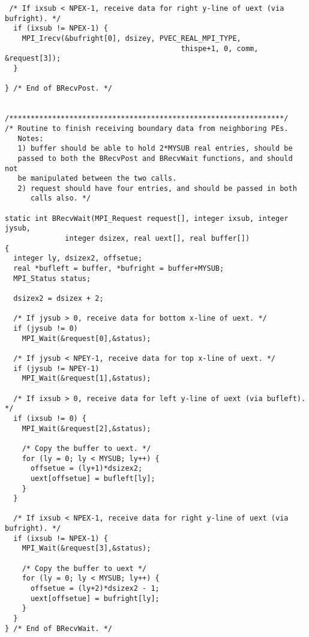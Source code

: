 \begin{verbatim}
 /* If ixsub < NPEX-1, receive data for right y-line of uext (via bufright). */
  if (ixsub != NPEX-1) {
    MPI_Irecv(&bufright[0], dsizey, PVEC_REAL_MPI_TYPE,
                                         thispe+1, 0, comm, &request[3]);
  }

} /* End of BRecvPost. */


/****************************************************************/
/* Routine to finish receiving boundary data from neighboring PEs.
   Notes:
   1) buffer should be able to hold 2*MYSUB real entries, should be
   passed to both the BRecvPost and BRecvWait functions, and should not
   be manipulated between the two calls.
   2) request should have four entries, and should be passed in both 
      calls also. */

static int BRecvWait(MPI_Request request[], integer ixsub, integer jysub,
		      integer dsizex, real uext[], real buffer[])
{
  integer ly, dsizex2, offsetue;
  real *bufleft = buffer, *bufright = buffer+MYSUB;
  MPI_Status status;

  dsizex2 = dsizex + 2;

  /* If jysub > 0, receive data for bottom x-line of uext. */
  if (jysub != 0)
    MPI_Wait(&request[0],&status);

  /* If jysub < NPEY-1, receive data for top x-line of uext. */
  if (jysub != NPEY-1)
    MPI_Wait(&request[1],&status);

  /* If ixsub > 0, receive data for left y-line of uext (via bufleft). */
  if (ixsub != 0) {
    MPI_Wait(&request[2],&status);

    /* Copy the buffer to uext. */
    for (ly = 0; ly < MYSUB; ly++) {
      offsetue = (ly+1)*dsizex2;
      uext[offsetue] = bufleft[ly];
    }
  }

  /* If ixsub < NPEX-1, receive data for right y-line of uext (via bufright). */
  if (ixsub != NPEX-1) {
    MPI_Wait(&request[3],&status);

    /* Copy the buffer to uext */
    for (ly = 0; ly < MYSUB; ly++) {
      offsetue = (ly+2)*dsizex2 - 1;
      uext[offsetue] = bufright[ly];
    }
  }
} /* End of BRecvWait. */



\end{verbatim}
